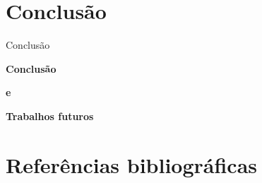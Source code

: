 \documentclass{beamer}
\begin{document}
\section{Conclusão}

\begin{frame}{Conclusão}

\Large
\centering
    
\textbf{Conclusão}

\textbf{e}

\textbf{Trabalhos futuros}

\end{frame}

\section{Referências bibliográficas}
\begin{frame}[allowframebreaks]
        \printbibliography[heading=none]
\end{frame}

\end{document}
